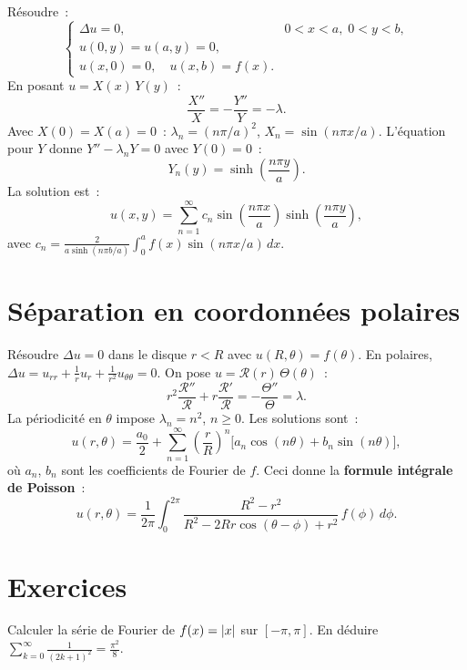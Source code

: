 \begin{exemple}
R\'esoudre~:
\[
    \begin{cases}
        \Delta u = 0, & 0 < x < a,\; 0 < y < b,\\
        u(0,y) = u(a,y) = 0,\\
        u(x,0) = 0, \quad u(x,b) = f(x).
    \end{cases}
\]
En posant $u = X(x)\, Y(y)$~:
\[
    \frac{X''}{X} = -\frac{Y''}{Y} = -\lambda.
\]
Avec $X(0) = X(a) = 0$~: $\lambda_n = (n\pi/a)^2$,
$X_n = \sin(n\pi x/a)$. L'\'equation pour $Y$ donne
$Y'' - \lambda_n Y = 0$ avec $Y(0) = 0$~:
\[
    Y_n(y) = \sinh\!\left(\frac{n\pi y}{a}\right).
\]
La solution est~:
\[
    u(x,y) = \sum_{n=1}^{\infty} c_n \sin\!\left(\frac{n\pi x}{a}\right)
    \sinh\!\left(\frac{n\pi y}{a}\right),
\]
avec $c_n = \frac{2}{a\sinh(n\pi b/a)}\int_0^a f(x)\sin(n\pi x/a)\, dx$.
\end{exemple}

\section{S\'eparation en coordonn\'ees polaires}

\begin{exemple}
R\'esoudre $\Delta u = 0$ dans le disque $r < R$ avec $u(R,\theta) = f(\theta)$.
En polaires, $\Delta u = u_{rr} + \frac{1}{r}u_r + \frac{1}{r^2}u_{\theta\theta} = 0$.
On pose $u = \mathcal{R}(r)\, \Theta(\theta)$~:
\[
    r^2\frac{\mathcal{R}''}{\mathcal{R}} + r\frac{\mathcal{R}'}{\mathcal{R}}
    = -\frac{\Theta''}{\Theta} = \lambda.
\]
La p\'eriodicit\'e en $\theta$ impose $\lambda_n = n^2$, $n \geq 0$.
Les solutions sont~:
\[
    u(r,\theta) = \frac{a_0}{2} + \sum_{n=1}^{\infty}
    \left(\frac{r}{R}\right)^n \bigl[a_n \cos(n\theta) + b_n \sin(n\theta)\bigr],
\]
o\`u $a_n$, $b_n$ sont les coefficients de Fourier de $f$.
Ceci donne la \textbf{formule int\'egrale de Poisson}~:
\[
    u(r,\theta) = \frac{1}{2\pi}\int_0^{2\pi}
    \frac{R^2 - r^2}{R^2 - 2Rr\cos(\theta-\phi) + r^2}\, f(\phi)\, d\phi.
\]
\end{exemple}

\section{Exercices}

\begin{exercice}
Calculer la s\'erie de Fourier de $f(x) = \left| x \right|$ sur $[-\pi,\pi]$.
En d\'eduire $\sum_{k=0}^{\infty} \frac{1}{(2k+1)^2} = \frac{\pi^2}{8}$.
\end{exercice}

